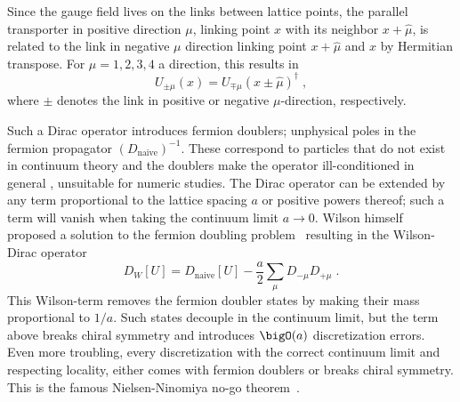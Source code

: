 Since the gauge field lives on the links between lattice points, the parallel transporter in positive direction $\mu$, linking point $x$ with its neighbor $x + \hat{\mu}$, is related to the link in negative $\mu$ direction linking point $x + \hat{\mu}$ and $x$ by Hermitian transpose.
For $\mu=1,2,3,4$ a direction, this results in
\begin{equation}
U_{\pm \mu}(x) = U_{\mp \mu}(x \pm \hat{\mu})^{\dagger} \;,
\end{equation}
where $\pm$ denotes the link in positive or negative $\mu$-direction, respectively.

Such a Dirac operator introduces fermion doublers; unphysical poles in the fermion propagator $(D_{\text{naive}})^{-1}$.
These correspond to particles that do not exist in continuum theory and the doublers make the operator ill-conditioned in general , unsuitable for numeric studies.
The Dirac operator can be extended by any term proportional to the lattice spacing $a$ or positive powers thereof; such a term will vanish when taking the continuum limit $a \to 0$.
Wilson himself proposed a solution to the fermion doubling problem~\cite{PhysRevD.25.2649} resulting in the Wilson-Dirac operator
\begin{equation} \label{eq:dirac:wilson}
D_W[U] = D_{\text{naive}}[U] - \frac{a}{2} \sum_{\mu} D_{-\mu} D_{+\mu} \;.
\end{equation}
This Wilson-term removes the fermion doubler states by making their mass proportional to $1/a$.
Such states decouple in the continuum limit, but the term above breaks chiral symmetry and introduces $\bigO(a)$ discretization errors.
Even more troubling, every discretization with the correct continuum limit and respecting locality, either comes with fermion doublers or breaks chiral symmetry.
This is the famous Nielsen-Ninomiya no-go theorem~\cite{Nielsen:1980rz,Nielsen:1981xu}.

